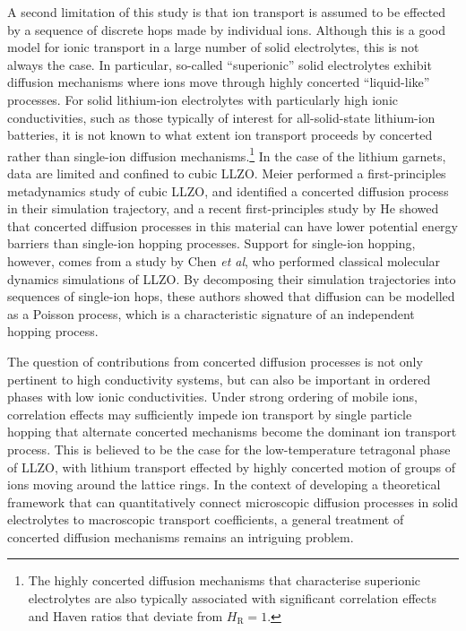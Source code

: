 \documentclass[aps,prb,twocolumn,superscriptaddress,reprint]{revtex4-1}
\begin{document}
A second limitation of this study is that ion transport is assumed to be effected by a sequence of discrete hops made by individual ions. Although this is a good model for ionic transport in a large number of solid electrolytes, this is not always the case. In particular, so-called ``superionic'' solid electrolytes exhibit diffusion mechanisms where ions move through highly concerted ``liquid-like'' processes.\cite{Catlow_AnnRevMaterSci1986,Hull_RepProgPhys2004} For solid lithium-ion electrolytes with particularly high ionic conductivities, such as those typically of interest for  all-solid-state lithium-ion batteries, it is not known to what extent ion transport proceeds by concerted rather than single-ion diffusion mechanisms.\footnote{The highly concerted diffusion mechanisms that characterise superionic electrolytes are also typically associated with significant correlation effects and Haven ratios that deviate from $H_\mathrm{R}=1$.\cite{SalanneEtAl_JPhysChemC2012,Hull_RepProgPhys2004}} In the case of the lithium garnets, data are limited and confined to cubic LLZO. Meier \etal performed a first-principles metadynamics study of cubic LLZO, and identified a concerted diffusion process in their simulation trajectory,\cite{MeierEtAl_JPhysChemC2014} and a recent first-principles study by He \etal showed that concerted diffusion processes in this material can have lower potential energy barriers than single-ion hopping processes. Support for single-ion hopping, however, comes from a study by Chen \emph{et al}, who performed classical molecular dynamics simulations of LLZO.\cite{ChenEtAl_SciRep2017} By decomposing their simulation trajectories into sequences of single-ion hops, these authors showed that diffusion can be modelled as a Poisson process, which is a characteristic signature of an independent hopping process.\cite{MorganAndMadden_PhysRevLett2014}

The question of contributions from concerted diffusion processes is not only pertinent to high conductivity systems, but can also be important in ordered phases with low ionic conductivities. Under strong ordering of mobile ions, correlation effects may sufficiently impede ion transport by single particle hopping that alternate concerted mechanisms become the dominant ion transport process.\cite{MorganAndMadden_PhysRevLett2014} This is believed to be the case for the low-temperature tetragonal phase of LLZO, with lithium transport effected by highly concerted motion of groups of ions moving around the lattice rings. \cite{BurbanoEtAl_PhysRevLett2016} In the context of developing a theoretical framework that can quantitatively connect microscopic diffusion processes in solid electrolytes to macroscopic transport coefficients, a general treatment of concerted diffusion mechanisms remains an intriguing problem. 
\end{document}

